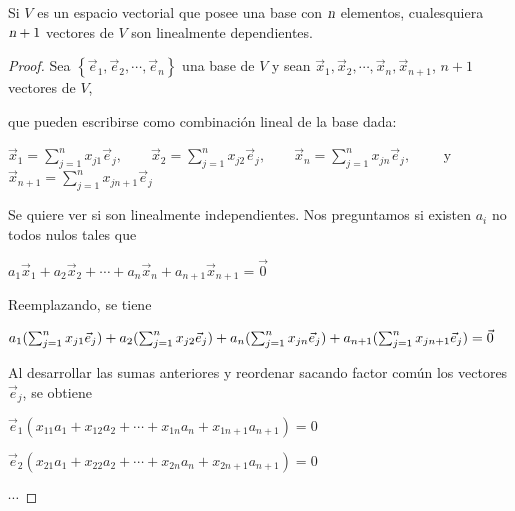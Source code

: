 \begin{theorem}
\label{Prop1}
Si $V$ es un espacio vectorial que posee una base con $\textsl{n}$ elementos, cualesquiera $\textsl{n}+1$ vectores de $V$ son linealmente dependientes.

\bigskip
\begin{proof}



Sea $\left\{\vec{e}_1,\vec{e}_2,\cdots, \vec{e}_n\right\}$ una base de $V$ y sean $\vec{x}_1,\vec{x}_2,\cdots, \vec{x}_n, \vec{x}_{n +1} $,  $n+1$ vectores de $V$,

\bigskip
\noindent
que pueden escribirse como combinación lineal de la base dada:

\bigskip

$\vec{x}_1= \sum_{j=1}^{n} x_{j1}\vec{e}_j,  \qquad \vec{x}_2= \sum_{j=1}^{n} x_{j2}\vec{e}_j,  \qquad \vec{x}_n= \sum_{j=1}^{n} x_{jn}\vec{e}_j,   \qquad $ y $\vec{x}_{n+1}= \sum_{j=1}^{n} x_{jn+1}\vec{e}_j $

\bigskip


Se quiere ver si son linealmente independientes.  Nos preguntamos  si existen $a_i$ no todos nulos tales que 
  
  \bigskip
  
 $a_1\vec{x}_1+a_2\vec{x}_2+\cdots + a_n \vec{x}_n + a_{n+1}\vec{x}_{n +1} = \vec{0} $  
 
 \bigskip
 
Reemplazando, se  tiene

 \bigskip
 
 $   a_1  (\sum_{j=1}^{n} x_{j1}\vec{e}_j)  +  a_2  (\sum_{j=1}^{n} x_{j2}\vec{e}_j) +  a_n  (\sum_{j=1}^{n} x_{jn}\vec{e}_j) \\ + a_{n+1}  (\sum_{j=1}^{n} x_{j n+1}\vec{e}_j)= \vec{0}    $
 
  \bigskip
  
  Al desarrollar las sumas anteriores y  reordenar  sacando factor común los vectores $\vec{e}_j$,  se obtiene
  
  \bigskip
  
  
  $\vec{e}_1 ( x_{11}a_1+x_{12}a_2+ \cdots +x_{1n}a_n   +x_{1n+1}a_{n +1})=0  $
  
  \bigskip
  
  $\vec{e}_2 ( x_{21}a_1+x_{22}a_2+\cdots +x_{2n}a_n   +x_{2n+1}a_{n +1})=0  $
  
  \bigskip
  
  $\cdots$
  
   \bigskip
  

\end{proof}
\end{theorem}

